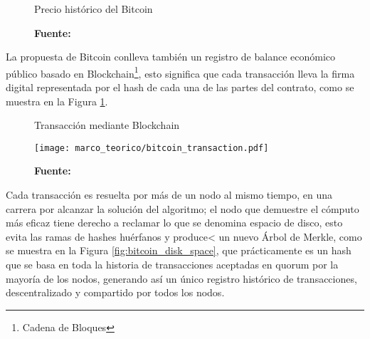 \documentclass[../main/main.tex]{subfiles}
\begin{document}
  \begin{figure}[H]
    \centering
    \caption{Precio histórico del Bitcoin}
    \newcommand\csvfile{../inc/marco_teorico/bitcoin_price.csv}
    \pgfplotstableread[col sep=comma]{\csvfile}\datatable
    \caption*{\textbf{Fuente:} \cite{web:bitstamp}}
  \end{figure}

  La propuesta de Bitcoin conlleva también un registro de balance económico público basado en Blockchain\footnote{Cadena de Bloques}, esto significa que cada transacción lleva la firma digital representada por el hash de cada una de las partes del contrato, como se muestra en la Figura \ref{fig:bitcoin_transaction}.

  \begin{figure}[ht]
    \centering
    \caption{Transacción mediante Blockchain}
    \texttt{[image: marco\_teorico/bitcoin\_transaction.pdf]}
    \caption*{\textbf{Fuente:} \cite[p.~2]{article:satoshi_bitcoin}}
    \label{fig:bitcoin_transaction}
  \end{figure}

  Cada transacción es resuelta por más de un nodo al mismo tiempo, en una carrera por alcanzar la solución del algoritmo; el nodo que demuestre el cómputo más eficaz tiene derecho a reclamar lo que se denomina espacio de disco, esto evita las ramas de hashes huérfanos y produce< un nuevo Árbol de Merkle, como se muestra en la Figura \ref{fig:bitcoin_disk_space}, que prácticamente es un hash que se basa en toda la historia de transacciones aceptadas en quorum por la mayoría de los nodos, generando así un único registro histórico de transacciones, descentralizado y compartido por todos los nodos.
\end{document}
